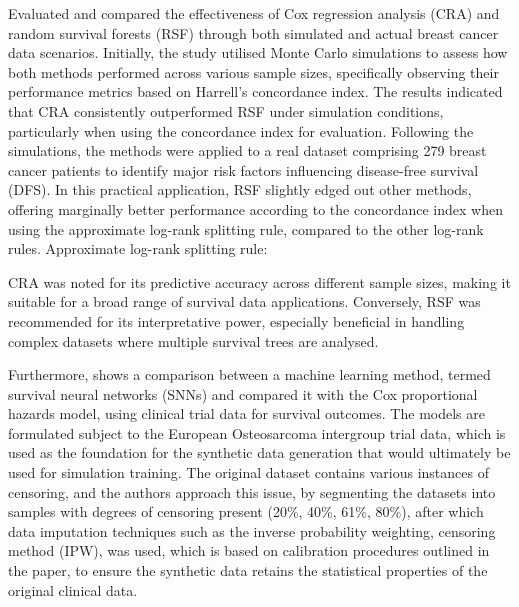 \noindent \parencite{kurt_omurlu_comparisons_2009} Evaluated and compared the effectiveness of Cox regression analysis (CRA) and random survival forests (RSF) through both simulated and actual breast cancer data scenarios. Initially, the study utilised Monte Carlo simulations to assess how both methods performed across various sample sizes, specifically observing their performance metrics based on Harrell's concordance index. The results indicated that CRA consistently outperformed RSF under simulation conditions, particularly when using the concordance index for evaluation. Following the simulations, the methods were applied to a real dataset comprising 279 breast cancer patients to identify major risk factors influencing disease-free survival (DFS). In this practical application, RSF slightly edged out other methods, offering marginally better performance according to the concordance index when using the approximate log-rank splitting rule, compared to the other log-rank rules. Approximate log-rank splitting rule:


\noindent \parencite{kurt_omurlu_comparisons_2009} CRA was noted for its predictive accuracy across different sample sizes, making it suitable for a broad range of survival data applications. Conversely, RSF was recommended for its interpretative power, especially beneficial in handling complex datasets where multiple survival trees are analysed.
\\
\par \noindent Furthermore, \parencite{kantidakis_simulation_2021} shows a comparison between a machine learning method, termed survival neural networks (SNNs) and compared it with the Cox proportional hazards model, using clinical trial data for survival outcomes. The models are formulated subject to the European Osteosarcoma intergroup trial data, which is used as the foundation for the synthetic data generation that would ultimately be used for simulation training. The original dataset contains various instances of censoring, and the authors approach this issue, by segmenting the datasets into samples with degrees of censoring present (20\%, 40\%, 61\%, 80\%), after which data imputation techniques such as the inverse probability weighting, censoring method (IPW), was used, which is based on calibration procedures outlined in the paper, to ensure the synthetic data retains the statistical properties of the original clinical data. 

